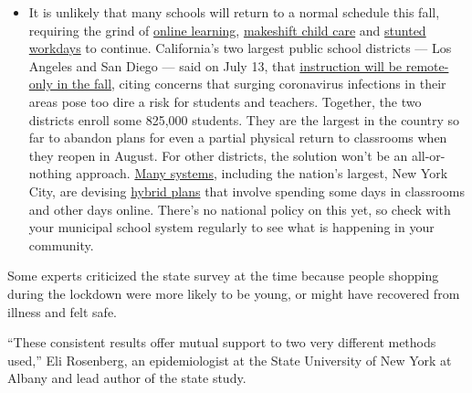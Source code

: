 \begin{itemize}
  \begin{itemize}
  \tightlist
  \item
    It is unlikely that many schools will return to a normal schedule
    this fall, requiring the grind of
    \href{https://www.nytimes.com/2020/06/05/us/coronavirus-education-lost-learning.html?action=click\&pgtype=Article\&state=default\&region=MAIN_CONTENT_3\&context=storylines_faq}{online
    learning},
    \href{https://www.nytimes.com/2020/05/29/us/coronavirus-child-care-centers.html?action=click\&pgtype=Article\&state=default\&region=MAIN_CONTENT_3\&context=storylines_faq}{makeshift
    child care} and
    \href{https://www.nytimes.com/2020/06/03/business/economy/coronavirus-working-women.html?action=click\&pgtype=Article\&state=default\&region=MAIN_CONTENT_3\&context=storylines_faq}{stunted
    workdays} to continue. California's two largest public school
    districts --- Los Angeles and San Diego --- said on July 13, that
    \href{https://www.nytimes.com/2020/07/13/us/lausd-san-diego-school-reopening.html?action=click\&pgtype=Article\&state=default\&region=MAIN_CONTENT_3\&context=storylines_faq}{instruction
    will be remote-only in the fall}, citing concerns that surging
    coronavirus infections in their areas pose too dire a risk for
    students and teachers. Together, the two districts enroll some
    825,000 students. They are the largest in the country so far to
    abandon plans for even a partial physical return to classrooms when
    they reopen in August. For other districts, the solution won't be an
    all-or-nothing approach.
    \href{https://bioethics.jhu.edu/research-and-outreach/projects/eschool-initiative/school-policy-tracker/}{Many
    systems}, including the nation's largest, New York City, are
    devising
    \href{https://www.nytimes.com/2020/06/26/us/coronavirus-schools-reopen-fall.html?action=click\&pgtype=Article\&state=default\&region=MAIN_CONTENT_3\&context=storylines_faq}{hybrid
    plans} that involve spending some days in classrooms and other days
    online. There's no national policy on this yet, so check with your
    municipal school system regularly to see what is happening in your
    community.
  \end{itemize}
\end{itemize}

Some experts criticized the state survey at the time because people
shopping during the lockdown were more likely to be young, or might have
recovered from illness and felt safe.

``These consistent results offer mutual support to two very different
methods used,'' Eli Rosenberg, an epidemiologist at the State University
of New York at Albany and lead author of the state study.

